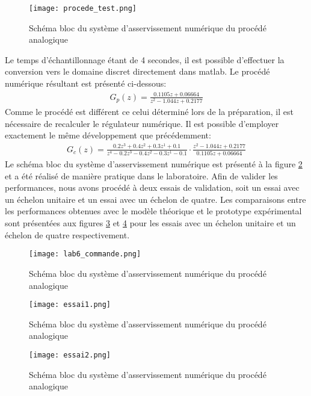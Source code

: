 \begin{figure}[htbp]
\centering
\texttt{[image: procede\_test.png]}
\caption{Schéma bloc du système d'asservissement numérique du procédé analogique}
\label{fig5}
\end{figure}

Le temps d'échantillonnage étant de 4 secondes, il est possible d'effectuer la conversion vers le domaine discret directement dans matlab. Le procédé numérique résultant est présenté ci-dessous:
\begin{gather}
G_p(z) = \frac{0.1105z + 0.06664}{z^2 -1.044z + 0.2177}
\end{gather}
Comme le procédé est différent ce celui déterminé lors de la préparation, il est nécessaire de recalculer le régulateur numérique. Il est possible d'employer exactement le même développement que précédemment:
\begin{gather}
G_c(z) = \frac{0.2z^{3} + 0.4z^{2} + 0.3z^{1} + 0.1}{z^4 - 0.2z^{3} - 0.4z^{2} - 0.3z^{1} - 0.1}\cdot \frac{z^2 -1.044z + 0.2177}{0.1105z + 0.06664}
\end{gather}
Le schéma bloc du système d'asservissement numérique est présenté à la figure \ref{fig2} et a été réalisé de manière pratique dans le laboratoire. Afin de valider les performances, nous avons procédé à deux essais de validation, soit un essai avec un échelon unitaire et un essai avec un échelon de quatre. Les comparaisons entre les performances obtenues avec le modèle théorique et le prototype expérimental sont présentées aux figures \ref{fig3} et \ref{fig4} pour les essais avec un échelon unitaire et un échelon de quatre respectivement. 



\begin{figure}[htbp]
\centering
\texttt{[image: lab6\_commande.png]}
\caption{Schéma bloc du système d'asservissement numérique du procédé analogique}
\label{fig2}
\end{figure}

\begin{figure}[htbp]
\centering
\texttt{[image: essai1.png]}
\caption{Schéma bloc du système d'asservissement numérique du procédé analogique}
\label{fig3}
\end{figure}

\begin{figure}[htbp]
\centering
\texttt{[image: essai2.png]}
\caption{Schéma bloc du système d'asservissement numérique du procédé analogique}
\label{fig4}
\end{figure}